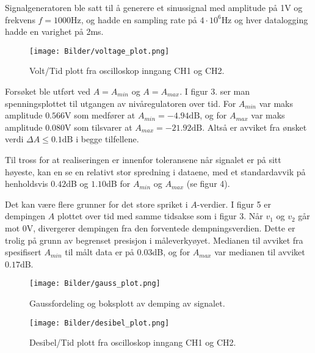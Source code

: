 Signalgeneratoren ble satt til å generere et sinussignal med amplitude på 1V og 
frekvens $f = 1000$Hz, og hadde en sampling rate på $4 \cdot 10^6$Hz og hver datalogging 
hadde en varighet på 2ms.

\begin{figure}[H]
    \centering
    \texttt{[image: Bilder/voltage\_plot.png]}
    \caption{Volt/Tid plott fra oscilloskop inngang CH1 og CH2.}
    \label{fig:volt_plot}
\end{figure}

Forsøket ble utført ved $A = A_{min}$ og $A = A_{max}$. I figur 3. ser man 
spenningsplottet til utgangen av nivåregulatoren over tid. For $A_{min}$ 
var maks amplitude $0.566\text{V}$ som medfører at $A_{min} = -4.94\text{dB}$, 
og for $A_{max}$ var maks amplitude $0.080 \text{V}$ som tilsvarer at 
$A_{max} = -21.92 \text{dB}$. Altså er avviket fra ønsket verdi 
$\Delta A \leq 0.1\text{dB}$ i begge tilfellene.

Til tross for at realiseringen er innenfor toleransene når signalet er på sitt høyeste,
kan en se en relativt stor spredning i dataene, med et standardavvik på henholdsvis 
$0.42$dB og $1.10$dB for $A_{min}$ og $A_{max}$ (se figur 4). 

Det kan være flere grunner for det store spriket i $A$-verdier. I figur 5 er dempingen 
$A$ plottet over tid med samme tidsakse som i figur 3. Når $v_1$ og $v_2$ går mot 0V, divergerer 
dempingen fra den forventede dempningsverdien. Dette er trolig på grunn av begrenset presisjon 
i måleverkyøyet. Medianen til avviket fra spesifisert $A_{min}$ til målt data er på $0.03$dB, og 
for $A_{max}$ var medianen til avviket $0.17$dB.

\begin{figure}[H]
    \centering
    \texttt{[image: Bilder/gauss\_plot.png]}
    \caption{Gaussfordeling og boksplott av demping av signalet.}
    \label{fig:gaus_plot}
\end{figure}

\begin{figure}[H]
    \centering
    \texttt{[image: Bilder/desibel\_plot.png]}
    \caption{Desibel/Tid plott fra oscilloskop inngang CH1 og CH2.}
    \label{fig:gain_plot}
\end{figure}
